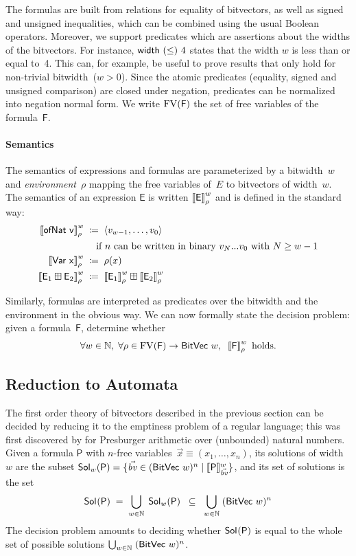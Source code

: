 The formulas are built from relations for equality of bitvectors, as well as
signed and unsigned inequalities, which can be combined using the usual Boolean
operators.
%
Moreover, we support predicates which are assertions about the widths of the bitvectors.
For instance, $\textsf{width}~{(\leq)}~4$ states that the width $w$
is less than or equal to~4. This can, for example, be useful to prove results
that only hold for non-trivial bitwidth~($w > 0$).
%
Since the atomic predicates (equality, signed and unsigned comparison) are
closed under negation, predicates can be normalized into negation normal form.
%
We write $\mathrm{FV}(\mathsf F)$ the set of free variables of the formula~$\mathsf F$.


\paragraph{Semantics}
The semantics of expressions and formulas are parameterized by a bitwidth~$w$
and \emph{environment}~$\rho$ mapping the free variables of~$E$ to bitvectors of width~$w$.
%
The semantics of an expression $\mathsf{E}$ is written $\left\llbracket \mathsf{E} \right\rrbracket^{w}_{\rho}$
and is defined in the standard way:
%
\begin{align*}
  \left\llbracket \mathsf{\mathsf{ofNat}~v} \right\rrbracket^{w}_{\rho} \;&\coloneqq\; \left< v_{w-1}, \dots, v_0 \right> \\
  &\quad \text{if~$n$ can be written in binary $v_N...v_0$ with $N \geq w-1$}\\
  \left\llbracket \mathsf{\mathsf{Var}~x} \right\rrbracket^{w}_{\rho} \;&\coloneqq\; \rho(x)\\
  \left\llbracket \mathsf{E}_1 \boxplus \mathsf{E}_2 \right\rrbracket^{w}_{\rho} \;&\coloneqq\;
    \left\llbracket \mathsf{E}_1 \right\rrbracket^{w}_{\rho} \boxplus \left\llbracket \mathsf{E}_2 \right\rrbracket^{w}_{\rho}
\end{align*}

\noindent
Similarly, formulas are interpreted as predicates over the bitwidth and the
environment in the obvious way.
%
We can now formally state the decision problem: given a formula~$\mathsf F$,
determine whether
\[
  \forall w \in \mathbb N,\; \forall \rho \in \mathrm{FV}(\mathsf F) \to \mathsf{BitVec}~{w},\;\; \left\llbracket \mathsf F \right\rrbracket^{w}_{\rho} \text{ holds}.
\]

\subsection{Reduction to Automata}
\label{sec:swbv:reduction-to-automata}

The first order theory of bitvectors described in the previous section can be
decided by reducing it to the emptiness problem of a regular language; this was
first discovered by \citet{Büchi1960} for Presburger arithmetic over (unbounded)
natural numbers.
%
Given a formula $\mathsf{P}$ with $n$-free variables~$\vec{x} \equiv (x_1, \dots, x_n)$,
its solutions of
width~$w$ are the subset $\mathsf{Sol}_{w}(\mathsf{P}) = \{ \vec{\mathit{bv}} \in (\mathsf{BitVec}~{w})^n \mid
\llbracket\mathsf{P}\rrbracket^w_{\vec{\mathit{bv}}} \}$, and its set of solutions is the set
%
\[
  \mathsf{Sol}_{}(\mathsf{P}) \;=\; \bigcup_{w \in \mathbb N}\; \mathsf{Sol}_{w}(\mathsf{P})
  \;\;\subseteq\;\;
  \bigcup_{w \in \mathbb N}\; (\mathsf{BitVec}~{w})^n
\]
%
The decision problem amounts to deciding whether $\mathsf{Sol}_{}(\mathsf{P})$ is equal
to the whole set of possible solutions $\bigcup_{w \in \mathbb N}\; (\mathsf{BitVec}~{w})^n$.

